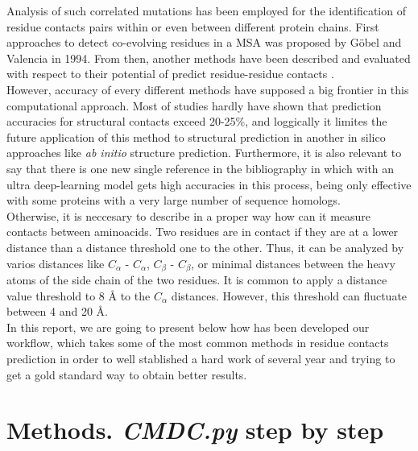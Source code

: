 \documentclass[12pt]{article}
\begin{document}
Analysis of such correlated mutations has been employed for the identification of residue contacts pairs within or even between different protein chains. First approaches to detect co-evolving residues in a MSA was proposed by Göbel and Valencia in 1994\cite{Gobel1994}. From then, another methods have been described and evaluated with respect to their potential of predict residue-residue contacts \cite{Vicatos2005}.\\

However, accuracy of every different methods have supposed a big frontier in this computational approach. Most of studies hardly have shown that prediction accuracies for structural contacts exceed 20-25\%, and loggically it limites the future application of this method to structural prediction in another in silico approaches like \textit{ab initio} structure prediction. Furthermore, it is also relevant to say that there is one new single reference in the bibliography in which with an ultra deep-learning model gets high accuracies in this process, being only effective with some proteins with a very large number of sequence homologs\cite{Wang2016}.\\

Otherwise, it is neccesary to describe in a proper way how can it measure contacts between aminoacids. Two residues are in contact if they are at a lower distance than a distance threshold one to the other. Thus, it can be analyzed by varios distances like $C_{\alpha}$ - $C_{\alpha}$, $C_{\beta}$ - $C_{\beta}$, or minimal distances between the heavy atoms of the side chain of the two residues. It is common to apply a distance value threshold to 8 \r{A} to the $C_{\alpha}$ distances. However, this threshold can fluctuate between 4 and 20 \r{A}\cite{Hunter2007}.\\

In this report, we are going to present below how has been developed our workflow, which takes some of the most common methods in residue contacts prediction in order to well stablished a hard work of several year and trying to get a gold standard way to obtain better results. 
\clearpage
\section{Methods. \textit{CMDC.py} step by step}
\end{document}
